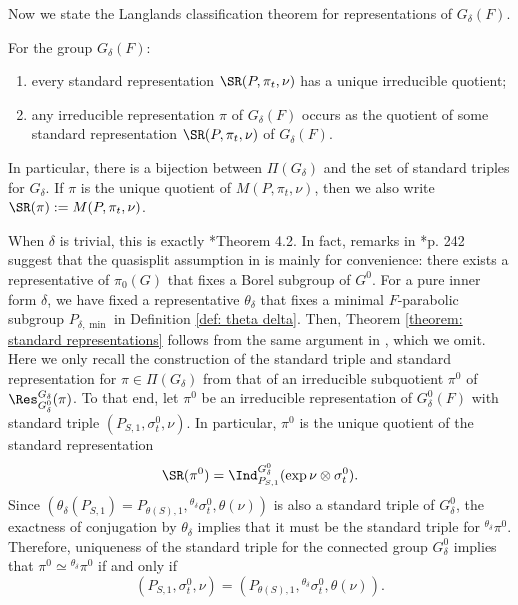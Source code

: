 \documentclass[11pt,letterpaper]{amsart}
\numberwithin{equation}{section}
\begin{document}
Now we state the Langlands classification theorem for representations of $G_{\delta}(F)$.

\begin{theorem}\label{theorem: standard representations}
For the group $G_\delta(F)$:
    \begin{enumerate}
        \item 
        every standard representation $\SR(P,\pi_t,\nu)$ has a unique irreducible quotient;
        \item 
        any irreducible representation $\pi$ of $G_\delta(F)$ occurs as the quotient of some standard representation $\SR(P,\pi_t,\nu)$ of $G_\delta(F)$.
    \end{enumerate}
    In particular, there is a bijection between $\Pi(G_{\delta})$ and the set of standard triples for $G_\delta$.
    If $\pi$ is the unique quotient of $M(P,\pi_t,\nu)$, then we also write $\SR(\pi):=M(P,\pi_t,\nu)$.
\end{theorem}

When $\delta$ is trivial, this is exactly \cite{BJ01}*{Theorem 4.2}. In fact, remarks in \cite{BJ01}*{p. 242} suggest that the quasisplit assumption in \cite{BJ01} is mainly for convenience: there exists a representative of $\pi_0(G)$ that fixes a Borel subgroup of $G^0$. 
For a pure inner form $\delta$, we have fixed a representative $\theta_{\delta}$ that fixes a minimal $F$-parabolic subgroup $P_{\delta,\min}$ in Definition \ref{def: theta delta}. Then, Theorem \ref{theorem: standard representations} follows from the same argument in \cite{BJ01}, which we omit. 
Here we only recall the construction of the standard triple and standard representation for $\pi \in \Pi(G_{\delta})$ from that of an irreducible subquotient $\pi^0$ of $\Res_{G_{\delta}^0}^{G_{\delta}}(\pi)$.
To that end, let $\pi^0$ be an irreducible representation of $G^0_\delta(F)$ with standard triple $( P_{{S},1},  \sigma_t^0,  \nu )$. In particular, $\pi^0$ is the unique quotient of the standard representation 
\[
\SR(\pi^0)=\Ind_{P_{{S},1}}^{G^0_\delta} (\exp \nu \otimes \sigma_{t}^0).
\] 
Since $(\theta_{\delta} (P_{{S},1})= P_{\theta({S}),1}, {}^{\theta_{\delta}}\sigma_t^0, \theta(\nu))$ is also a standard triple of $G_{\delta}^0$, the exactness of conjugation by $\theta_{\delta}$ implies that it must be the standard triple for ${}^{\theta_{\delta}}\pi^0$. Therefore, uniqueness of the standard triple for the connected group $G_{\delta}^0$ implies that $\pi^0 \simeq {}^{\theta_{\delta}}{\pi}^0$ if and only if 
\[
( P_{{S},1}, \sigma_t^0,  \nu  )=( P_{\theta({S}),1} , {}^{\theta_{\delta}}\sigma_t^0, \theta ( \nu)).
\]
\end{document}
